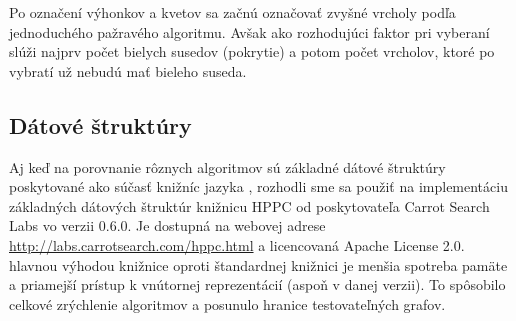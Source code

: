 Po označení výhonkov a kvetov sa začnú označovať zvyšné vrcholy podľa 
jednoduchého pažravého algoritmu. Avšak ako rozhodujúci faktor pri vyberaní 
slúži najprv počet bielych susedov (pokrytie) a potom počet vrcholov, ktoré 
po vybratí už nebudú mať bieleho suseda.

\subsection{Dátové štruktúry}

Aj keď na porovnanie rôznych algoritmov sú základné dátové štruktúry 
poskytované ako súčasť knižníc jazyka \Java, rozhodli sme sa použiť na 
implementáciu základných dátových štruktúr knižnicu HPPC od poskytovateľa 
Carrot Search Labs vo verzii 0.6.0. Je dostupná na webovej adrese 
\url{http://labs.carrotsearch.com/hppc.html} a licencovaná Apache License 2.0. 
hlavnou výhodou knižnice oproti štandardnej knižnici je menšia spotreba pamäte 
a priamejší prístup k vnútornej reprezentácií (aspoň v danej verzii). To 
spôsobilo celkové zrýchlenie algoritmov a posunulo hranice testovateľných 
grafov.


